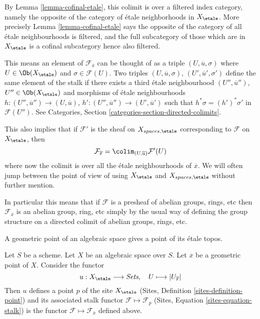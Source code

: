 \noindent
By
Lemma \ref{lemma-cofinal-etale},
this colimit is over a filtered
index category, namely the opposite of the category of \'etale neighborhoods
in $X_\etale$. More precisely
Lemma \ref{lemma-cofinal-etale}
says the opposite of the category of all \'etale neighbourhoods is filtered,
and the full subcategory of those which are in $X_\etale$ is a cofinal
subcategory hence also filtered.

\medskip\noindent
This means an element of $\mathcal{F}_{\overline{x}}$ can be
thought of as a triple $(U, \overline{u}, \sigma)$ where
$U \in \Ob(X_\etale)$ and $\sigma \in \mathcal{F}(U)$.
Two triples $(U, \overline{u}, \sigma)$, $(U', \overline{u}', \sigma')$
define the same element of the stalk if there exists a third
\'etale neighbourhood
$(U'', \overline{u}'')$, $U'' \in \Ob(X_\etale)$
and morphisms of \'etale neighbourhoods
$h : (U'', \overline{u}'') \to (U, \overline{u})$,
$h' : (U'', \overline{u}'') \to (U', \overline{u}')$ such that
$h^*\sigma = (h')^*\sigma'$ in $\mathcal{F}(U'')$. See
Categories, Section \ref{categories-section-directed-colimits}.

\medskip\noindent
This also implies that if $\mathcal{F}'$ is the sheaf on
$X_{spaces, \etale}$ corresponding to $\mathcal{F}$ on
$X_\etale$, then
\begin{equation}
\label{equation-stalk-spaces-etale}
\mathcal{F}_{\overline{x}} = \colim_{(U, \overline{u})} \mathcal{F}'(U)
\end{equation}
where now the colimit is over all the \'etale neighbourhoods of $\overline{x}$.
We will often jump between the point of view of using $X_\etale$
and $X_{spaces, \etale}$ without further mention.

\medskip\noindent
In particular this means that if $\mathcal{F}$ is a presheaf of
abelian groups, rings, etc then $\mathcal{F}_{\overline{x}}$ is
an abelian group, ring, etc simply by the usual way of defining the
group structure on a directed colimit of abelian groups, rings, etc.

\begin{lemma}
\label{lemma-stalk-gives-point}
\begin{slogan}
A geometric point of an algebraic space gives a point of its \'etale topos.
\end{slogan}
Let $S$ be a scheme.
Let $X$ be an algebraic space over $S$.
Let $\overline{x}$ be a geometric point of $X$.
Consider the functor
$$
u : X_\etale \longrightarrow \textit{Sets}, \quad
U \longmapsto |U_{\overline{x}}|
$$
Then $u$ defines a point $p$ of the site $X_\etale$
(Sites, Definition \ref{sites-definition-point})
and its associated stalk functor $\mathcal{F} \mapsto \mathcal{F}_p$
(Sites, Equation \ref{sites-equation-stalk})
is the functor $\mathcal{F} \mapsto \mathcal{F}_{\overline{x}}$
defined above.
\end{lemma}

